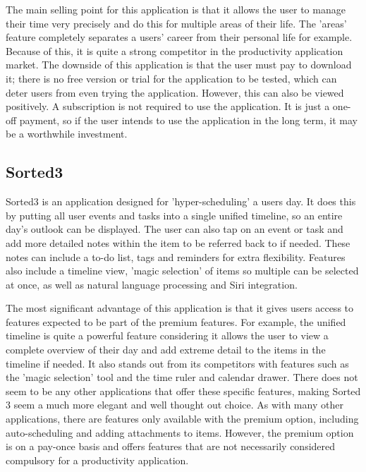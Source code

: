 	        
	        
	        The main selling point for this application is that it allows the user to manage their time very precisely and do this for multiple areas of their life.  The 'areas' feature completely separates a users' career from their personal life for example.  Because of this, it is quite a strong competitor in the productivity application market.  The downside of this application is that the user must pay to download it; there is no free version or trial for the application to be tested, which can deter users from even trying the application. However, this can also be viewed positively. A subscription is not required to use the application. It is just a one-off payment, so if the user intends to use the application in the long term, it may be a worthwhile investment.
	        
	        \subsection{Sorted3}
	        
	        Sorted3\cite{sorted} is an application designed for 'hyper-scheduling' a users day.  It does this by putting all user events and tasks into a single unified timeline, so an entire day's outlook can be displayed.  The user can also tap on an event or task and add more detailed notes within the item to be referred back to if needed.  These notes can include a to-do list, tags and reminders for extra flexibility.  Features also include a timeline view, 'magic selection' of items so multiple can be selected at once, as well as natural language processing and Siri integration.
	        
	        
	        
	        The most significant advantage of this application is that it gives users access to features expected to be part of the premium features.  For example, the unified timeline is quite a powerful feature considering it allows the user to view a complete overview of their day and add extreme detail to the items in the timeline if needed.  It also stands out from its competitors with features such as the 'magic selection' tool and the time ruler and calendar drawer.  There does not seem to be any other applications that offer these specific features, making Sorted 3 seem a much more elegant and well thought out choice.  As with many other applications, there are features only available with the premium option, including auto-scheduling and adding attachments to items.  However, the premium option is on a pay-once basis and offers features that are not necessarily considered compulsory for a productivity application.
	        
